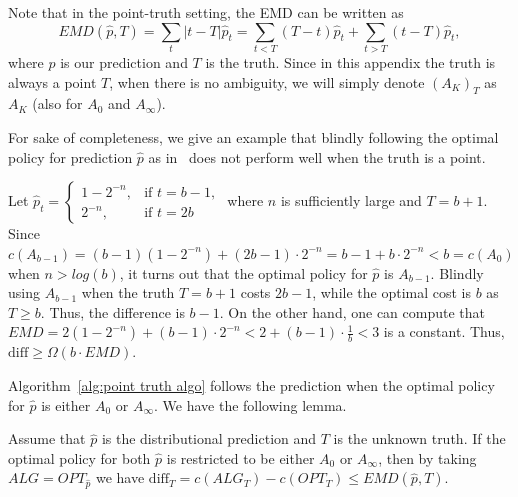 Note that in the point-truth setting, the EMD can be written as
\[EMD(\hat{p},T)=\sum_{t} |t-T|\hat{p}_t = \sum_{t<T}(T-t)\hat{p}_t + \sum_{t>T}(t-T)\hat{p}_t,\]
where $\hat{p}$ is our prediction and $T$ is the truth. Since in this appendix the truth is always a point $T$, when there is no ambiguity, we will simply denote $(A_K)_T$ as $A_K$ (also for $A_0$ and $A_\infty$).

For sake of completeness, we give an example that blindly following the optimal policy for prediction $\hat{p}$ as in~\cite{kumar2024improvingonlinealgorithmsml} does not perform well when the truth is a point.


\begin{Example}
\label{blindly follow bad example}
    Let $\hat{p}_t = \begin{cases} 1 - 2^{-n}, & \text{if } t = b-1, \\ 2^{-n}, & \text{if } t = 2b \end{cases}$ where $n$ is sufficiently large and $T=b+1$. Since $c(A_{b-1})=(b-1)(1-2^{-n})+(2b-1)\cdot 2^{-n} = b-1+b \cdot 2^{-n}<b=c(A_0)$ when $n>log(b)$, it turns out that the optimal policy for $\hat{p}$ is $A_{b-1}$. Blindly using $A_{b-1}$ when the truth $T=b+1$ costs $2b-1$, while the optimal cost is $b$ as $T \geq b$. Thus, the difference is $b-1$. On the other hand, one can compute that $EMD=2(1-2^{-n})+(b-1)\cdot 2^{-n}<2+(b-1)\cdot \frac{1}{b}<3$ is a constant. Thus, $\text{diff} \geq \Omega(b\cdot EMD)$.
\end{Example}

Algorithm~\ref{alg:point truth algo} follows the prediction when the optimal policy for $\hat{p}$ is either $A_0$ or $A_\infty$. We have the following lemma.

\begin{lemma}
    \label{phat and p choose from A_0 and Ainf}
    Assume that $\hat{p}$ is the distributional prediction and $T$ is the unknown truth. If the optimal policy for both $\hat{p}$ is restricted to be either $A_0$ or $A_\infty$, then by taking $ALG=OPT_{\hat{p}}$ we have $\text{diff}_T = c(ALG_T)-c(OPT_T) \leq EMD(\hat{p},T)$.
\end{lemma}

